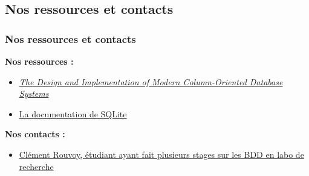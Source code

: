 \documentclass[a4paper,12pt]{beamer}
\begin{document}
\subsection{Nos ressources et contacts}
\begin{frame}
    \frametitle{Nos ressources et contacts}

    \textbf{Nos ressources :}
    \begin{itemize}
        \item \href{https://drive.google.com/file/d/1KNmuRBf8CV-s-zqdkUEP8iyYlPgFiglb/view?usp=drive_link}{\textit{The Design and Implementation of Modern Column-Oriented Database Systems}}
        \item \href{https://www.sqlite.org/docs.html}{La documentation de SQLite}
    \end{itemize}

    \medskip

    \textbf{Nos contacts :}
    \begin{itemize}
        \item \href{https://www.normalesup.org/~rouvroy}{Clément Rouvoy, étudiant ayant fait plusieurs stages sur les BDD en labo de recherche}
    \end{itemize}
\end{frame}
\end{document}
